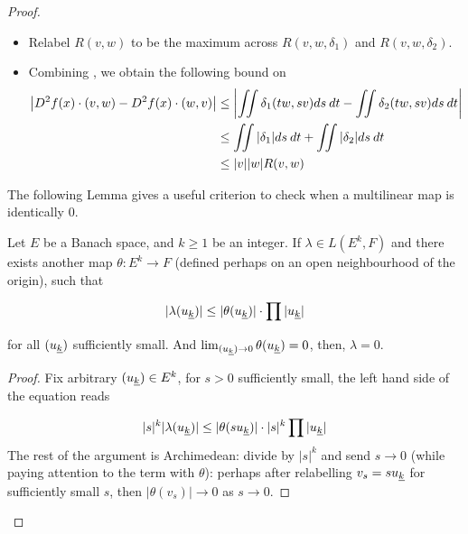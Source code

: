\documentclass[../main-manifolds.tex]{subfiles}
\begin{document}
\begin{proof}
\begin{note}
\begin{itemize}
        $A$ is clearly compact, and the continuity of $D^2f$ means 
        
        \begin{equation}\label{second-derivative-R}
        R(v,w,\delta) = \sup_{y\in A}\abs{D^2f(x + y) - D^2f(x)}\quad\text{is finite},\qqtext{and}\lim_{(v,w)\to 0}R(v,w,\delta)=0
        \end{equation}
        
        See the remark after this proof for a generalized version of this 'compact linear combination' argument.
        
        \item Relabel $R(v,w)$ to be the maximum across $R(v,w,\delta_1)$ and $R(v,w,\delta_2)$. 
        \item Combining , we obtain the following bound on 
        \begin{align}
            \abs{D^2f(x)\cdot(v,w) - D^2f(x)\cdot(w,v)} &\leq \abs{\iint\delta_1(tw,sv) ds\: dt - \iint\delta_2(tw,sv)ds\: dt}\nonumber\\
            &\leq \iint\abs{\delta_1}ds\: dt + \iint\abs{\delta_2}ds\: dt\nonumber \\
            &\leq \abs{v}\abs{w}R(v,w)\label{second-derivative-step3}
        \end{align}
    \end{itemize}


    The following Lemma gives a useful criterion to check when a multilinear map is identically $0$.
    \begin{lemma}
        Let $E$ be a Banach space, and $k\geq 1$ be an integer. If $\lambda\in L(E^k, F)$ and there exists another map $\theta: E^k\to F$ (defined perhaps on an open neighbourhood of the origin), such that

        \[
        \vert \lambda(\UL{u}[k])\vert \leq\vert\theta(\UL{u}[k])\vert\cdot\prod\vert \UL{u}[k]\vert
        \]
        
        for all $(\UL{u}[k])$ sufficiently small. And $\lim_{(\UL{u}[k]) \to 0}\theta(\UL{u}[k])=0$, then, $\lambda=0$.
    \end{lemma}
    \begin{proof}
        Fix arbitrary $(\UL{u}[k])\in E^k$, for $s>0$ sufficiently small, the left hand side of the equation reads

        \[
            \vert s\vert^k\vert\lambda (\UL{u}[k])\vert\leq\vert\theta(s\UL{u}[k])\vert\cdot\vert s\vert^k\prod \vert\UL{u}[k]\vert
        \]
        The rest of the argument is Archimedean: divide by $\vert s\vert^k$ and send $s\to 0$ (while paying attention to the term with $\theta$): perhaps after relabelling $v_s = s\UL{u}[k]$ for sufficiently small $s$, then $\vert \theta(v_s)\vert\to 0$ as $s\to 0$.
    \end{proof}
        
    \end{note}
    
    

\end{proof}
\end{document}
